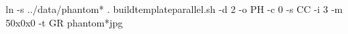 ln -s ../data/phantom* .  
buildtemplateparallel.sh -d 2 -o PH -c 0 -s CC -i 3 -m 50x0x0 -t GR  phantom*jpg 
